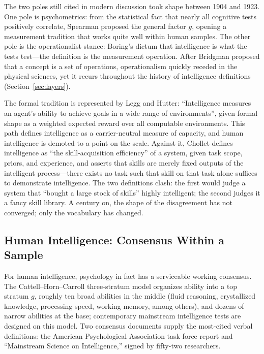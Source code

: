 \documentclass[10pt]{article}
\begin{document}
The two poles still cited in modern discussion took shape between 1904 and 1923. One pole is psychometrics: from the statistical fact that nearly all cognitive tests positively correlate, Spearman proposed the general factor $g$\cite{spearman1904general}, opening a measurement tradition that works quite well within human samples. The other pole is the operationalist stance: Boring's dictum that intelligence is what the tests test\cite{boring1923intelligence}---the definition is the measurement operation. After Bridgman proposed that a concept is a set of operations\cite{bridgman1927logic}, operationalism quickly receded in the physical sciences, yet it recurs throughout the history of intelligence definitions (Section~\ref{sec:layers}).

The formal tradition is represented by Legg and Hutter: ``Intelligence measures an agent's ability to achieve goals in a wide range of environments''\cite{legg2007universal}, given formal shape as a weighted expected reward over all computable environments. This path defines intelligence as a carrier-neutral measure of capacity, and human intelligence is demoted to a point on the scale. Against it, Chollet defines intelligence as ``the skill-acquisition efficiency'' of a system, given task scope, priors, and experience\cite{chollet2019measure}, and asserts that skills are merely fixed outputs of the intelligent process---there exists no task such that skill on that task alone suffices to demonstrate intelligence. The two definitions clash: the first would judge a system that ``bought a large stock of skills'' highly intelligent; the second judges it a fancy skill library. A century on, the shape of the disagreement has not converged; only the vocabulary has changed.

\subsection{Human Intelligence: Consensus Within a Sample}

For human intelligence, psychology in fact has a serviceable working consensus. The Cattell--Horn--Carroll three-stratum model organizes ability into a top stratum $g$, roughly ten broad abilities in the middle (fluid reasoning, crystallized knowledge, processing speed, working memory, among others), and dozens of narrow abilities at the base\cite{mcgrew2023chc}; contemporary mainstream intelligence tests are designed on this model. Two consensus documents supply the most-cited verbal definitions: the American Psychological Association task force report\cite{neisser1996intelligence} and ``Mainstream Science on Intelligence,'' signed by fifty-two researchers\cite{gottfredson1997mainstream}.
\end{document}
